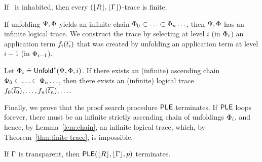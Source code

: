 \begin{theorem}\label{thm:finite-trace}
If %
   \ \env is inhabited,
then every $(\lfloor R\rfloor ,\lfloor \Gamma\rfloor )$-trace is finite.
\end{theorem}

%
If unfolding $\Psi, \Phi$ yields
an infinite chain $\Phi_0 \subset \ldots \subset \Phi_n \ldots$,
then $\Psi, \Phi$ has an infinite logical trace.
%
We construct the trace
by selecting at level $i$
(\ie in $\Phi_i$)
an application term
$f_i({\overline{t_i}})$
that was created by
unfolding an application
term at level $i-1$
(\ie in $\Phi_{i-1}$).

\begin{lemma}  \label{lem:chain}
Let $\Phi_i \doteq \mathsf{Unfold}^{*}(\Psi,\Phi,i)$.
If there exists an (infinite) ascending chain
$\Phi_0 \subset \ldots \subset \Phi_n \ldots$,
then there exists an (infinite) logical trace
$f_0({\overline{t_0}}),\ldots,f_n({\overline{t_n}}),\ldots$.
\end{lemma}

%
Finally, we prove that the proof search
procedure $\mathsf{PLE}$ terminates.
%
If $\mathsf{PLE}$ loops forever,
there must be an infinite
strictly ascending chain of
unfoldings $\Phi_i$, and
hence, by Lemma~\ref{lem:chain},
an infinite logical trace, which,
by Theorem~\ref{thm:finite-trace},
is impossible.
%
\begin{theorem} \label{thm:termination}
  If $\Gamma$ is transparent,
  then $\mathsf{PLE}(\lfloor R\rfloor ,\lfloor \Gamma\rfloor ,p)$ terminates.
\end{theorem}


